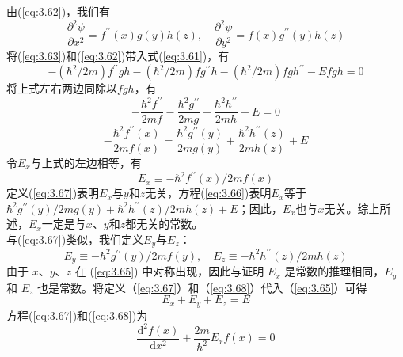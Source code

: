 	\indent 由(\ref{eq:3.62})，我们有
	\begin{equation}
		\frac{\partial^2\psi}{\partial x^2} = f^{\prime\prime}\left(x\right)g\left(y\right)h\left(z\right), \quad \frac{\partial^2\psi}{\partial y^2} = f\left(x\right)g^{\prime\prime}\left(y\right)h\left(z\right)
		\label{eq:3.63}
	\end{equation}
	将(\ref{eq:3.63})和(\ref{eq:3.62})带入式(\ref{eq:3.61})，有
	\begin{equation}
		-\left(\hbar^2/2m\right)f^{\prime\prime}gh-\left(\hbar^2/2m\right)fg^{\prime\prime}h-\left(\hbar^2/2m\right)fgh^{\prime\prime}-Efgh = 0
		\label{eq:3.64}
	\end{equation}
	将上式左右两边同除以$fgh$，有
	\begin{equation}
		- \frac{\hbar^2f^{\prime\prime}}{2mf}- \frac{\hbar^2g^{\prime\prime}}{2mg}- \frac{\hbar^2h^{\prime\prime}}{2mh} -E = 0
		\label{eq:3.65}
	\end{equation}
	\begin{equation}
		-\frac{\hbar^2f^{\prime\prime}\left(x\right)}{2mf\left(x\right)} = \frac{\hbar^2g^{\prime\prime}\left(y\right)}{2mg\left(y\right)}+\frac{\hbar^2h^{\prime\prime}\left(z\right)}{2mh\left(z\right)}+E
		\label{eq:3.66}
	\end{equation}
	\indent 令$E_x$与上式的左边相等，有
	\begin{equation}
		E_x \equiv -\hbar^2f^{\prime\prime}\left(x\right)/2mf\left(x\right)
		\label{eq:3.67}
	\end{equation}
	定义(\ref{eq:3.67})表明$E_x$与$y$和$z$无关，方程(\ref{eq:3.66})表明$E_x$等于$\hbar^2g^{\prime\prime}\left(y\right)/2mg\left(y\right)+\hbar^2h^{\prime\prime}\left(z\right)/2mh\left(z\right)+E$；因此，$E_x$也与$x$无关。综上所述，$E_x$一定是与$x$、$y$和$z$都无关的常数。\\
	\indent 与(\ref{eq:3.67})类似，我们定义$E_y$与$E_z$：
	\begin{equation}
		E_y \equiv -\hbar^2g^{\prime\prime}\left(y\right)/2mf\left(y\right), \quad E_z \equiv -\hbar^2h^{\prime\prime}\left(z\right)/2mh\left(z\right)
		\label{eq:3.68}
	\end{equation}
	由于 $x$、$y$、$z$ 在 (\ref{eq:3.65}) 中对称出现，因此与证明 $E_x$ 是常数的推理相同，$E_y$ 和 $E_z$ 也是常数。将定义（\ref{eq:3.67}）和（\ref{eq:3.68}）代入（\ref{eq:3.65}）可得
	\begin{equation}
		E_x+E_y+E_z=E
		\label{eq:3.69}
	\end{equation}
	\indent 方程(\ref{eq:3.67})和(\ref{eq:3.68})为
	\begin{equation}
		\frac{\mathrm{d}^2f\left(x\right)}{\mathrm{d}x^2}+\frac{2m}{\hbar^2}E_xf\left(x\right) = 0
		\label{eq:3.70}
	\end{equation}
